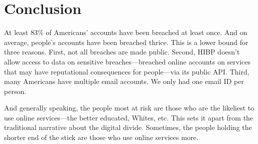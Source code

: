 \documentclass[12pt, letterpaper]{article}
\begin{document}
\section*{Conclusion}
At least 83\% of Americans' accounts have been breached at least once. And on average, people's accounts have been breached thrice. This is a lower bound for three reasons. First, not all breaches are made public. Second, HIBP doesn't allow access to data on sensitive breaches---breached online accounts on services that may have reputational consequences for people---via its public API. Third, many Americans have multiple email accounts. We only had one email ID per person. 

And generally speaking, the people most at risk are those who are the likeliest to use online services---the better educated, Whites, etc. This sets it apart from the traditional narrative about the digital divide. Sometimes, the people holding the shorter end of the stick are those who use online services more. 

\clearpage


\end{document}
